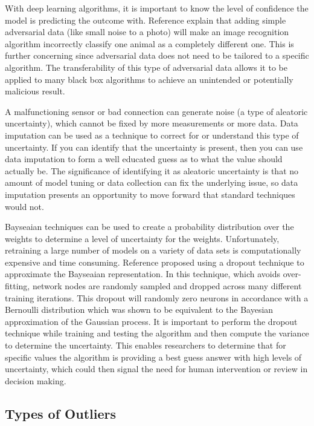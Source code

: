 With deep learning algorithms, it is important to know the level of confidence the model is predicting the outcome with. Reference \parencite{explaining-adversarial-examples} explain that adding simple adversarial data (like small noise to a photo) will make an image recognition algorithm incorrectly classify one animal as a completely different one. This is further concerning since adversarial data does not need to be tailored to a specific algorithm. The transferability of this type of adversarial data allows it to be applied to many black box algorithms to achieve an unintended or potentially malicious result. 

A malfunctioning sensor or bad connection can generate noise (a type of aleatoric uncertainty), which cannot be fixed by more measurements or more data. Data imputation can be used as a technique to correct for or understand this type of uncertainty. If you can identify that the uncertainty is present, then you can use data imputation to form a well educated guess as to what the value should actually be. The significance of identifying it as aleatoric uncertainty is that no amount of model tuning or data collection can fix the underlying issue, so data imputation presents an opportunity to move forward that standard techniques would not.

Bayseaian techniques can be used to create a probability distribution over the weights to determine a level of uncertainty for the weights. Unfortunately, retraining a large number of models on a variety of data sets is computationally expensive and time consuming. Reference \parencite{gal2016dropout} proposed using a dropout technique to approximate the Bayseaian representation. In this technique, which avoids over-fitting, network nodes are randomly sampled and dropped across many different training iterations. This dropout will randomly zero neurons in accordance with a Bernoulli distribution which was shown to be equivalent to the Bayesian approximation of the Gaussian process. It is important to perform the dropout technique while training and testing the algorithm and then compute the variance to determine the uncertainty. This enables researchers to determine that for specific values the algorithm is providing a best guess answer with high levels of uncertainty, which could then signal the need for human intervention or review in decision making.  

\subsection{Types of Outliers}

